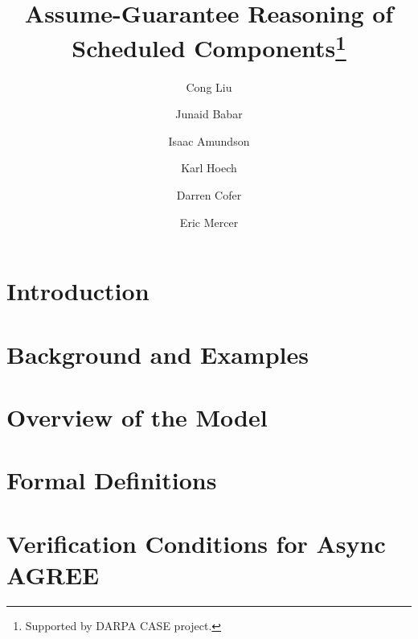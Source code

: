 \documentclass[runningheads]{llncs}
\begin{document}
%
\title{Assume-Guarantee Reasoning of Scheduled Components\thanks{Supported by DARPA CASE project.}}
%
%
\author{
     Cong Liu 
\and Junaid Babar 
\and Isaac Amundson 
\and Karl Hoech 
\and Darren Cofer
\and Eric Mercer}
%
%
%
\maketitle              %
%
\begin{abstract}

\end{abstract}

\section{Introduction}


\section{Background and Examples}
\label{example}


\section{Overview of the Model}
\label{overview}


\section{Formal Definitions}
\label{async}


\section{Verification Conditions for Async AGREE}

\end{document}
